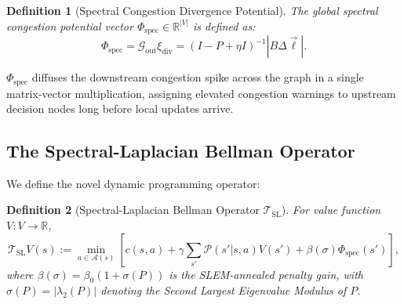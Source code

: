 \documentclass[11pt,a4paper]{article}
\newtheorem{definition}{Definition}
\begin{document}
\begin{definition}[Spectral Congestion Divergence Potential]
The global spectral congestion potential vector $\Phi_{\text{spec}} \in \mathbb{R}^{|V|}$ is defined as:
\begin{equation}
\Phi_{\text{spec}} = \mathcal{G}_{\text{out}} \xi_{\text{div}} = (I - P + \eta I)^{-1} |B \Delta \vec{\ell}|.
\end{equation}
\end{definition}

$\Phi_{\text{spec}}$ diffuses the downstream congestion spike across the graph in a single matrix-vector multiplication, assigning elevated congestion warnings to upstream decision nodes long before local updates arrive.

\subsection{The Spectral-Laplacian Bellman Operator}
We define the novel dynamic programming operator:
\begin{definition}[Spectral-Laplacian Bellman Operator $\mathcal{T}_{\text{SL}}$]
For value function $V: V \to \mathbb{R}$,
\begin{equation}
\mathcal{T}_{\text{SL}} V(s) := \min_{a \in \mathcal{A}(s)} \left[ c(s, a) + \gamma \sum_{s'} \mathcal{P}(s'|s, a) V(s') + \beta(\sigma) \Phi_{\text{spec}}(s') \right],
\end{equation}
where $\beta(\sigma) = \beta_0 (1 + \sigma(P))$ is the SLEM-annealed penalty gain, with $\sigma(P) = |\lambda_2(P)|$ denoting the Second Largest Eigenvalue Modulus of $P$.
\end{definition}
\end{document}
